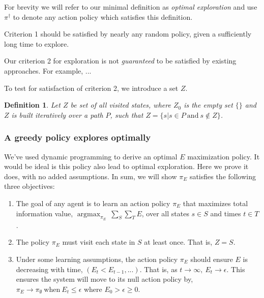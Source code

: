 \documentclass[9pt,twocolumn,twoside]{pnas-new}
\DeclareMathOperator*{\argmax}{argmax}
\newtheorem{definition}{Definition}
\begin{document}
For brevity we will refer to our minimal definition as \textit{optimal exploration} and use $\pi^{\dagger}$ to denote any action policy which satisfies this definition.

Criterion 1 should be satisfied by nearly any random policy, given a sufficiently long time to explore. %

Our criterion 2 for exploration is not \textit{guaranteed} to be satisfied by existing approaches.  For example, ... %


To test for satisfaction of criterion 2, we introduce a set $Z$. 

\begin{definition}
    Let $Z$ be set of all visited states, where $Z_0$ is the empty set $\{\}$ and $Z$ is built iteratively over a path $P$, such that $Z = \{s | s \in P\ \text{and}\ s \not\in Z\}$.    
\end{definition}

\subsubsection*{A greedy policy explores optimally}
We've used dynamic programming to derive an optimal $E$ maximization policy. It would be ideal is this policy also lead to optimal exploration. Here we prove it does, with no added assumptions. In sum, we will show $\pi_E$ satisfies the following three objectives:

\begin{enumerate}[noitemsep,wide=0pt,leftmargin=\dimexpr\labelwidth+2\labelsep\relax]
    \item The goal of any agent is to learn an action policy $\pi_E$ that maximizes total information value, $\argmax_{\pi_E} \ \sum_S \sum_T E$, over all states $s \in S$ and times $t \in T$.
    \item The policy $\pi_E$ must visit each state in $S$ at least once. That is, $Z = S$.
    \item Under some learning assumptions, the action policy $\pi_E$ should ensure $E$ is decreasing with time, $(E_t < E_{t-1}, ...)$. That is, as $t \rightarrow \infty,\ E_t \rightarrow \epsilon$. This ensures the system will move to its null action policy by, $\pi_E \rightarrow \pi_{\emptyset} \ \text{when} \ E_t \leq \epsilon$ where $E_0 > \epsilon \geq 0$.
\end{enumerate}
\end{document}
